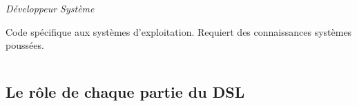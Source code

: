 \documentclass[]{beamer}
\begin{document}
\begin{frame}
\begin{columns}[c]
    \begin{column}[r,T]{115pt}
         {
            \begin{center} \large{\itshape{Développeur Système}} \end{center}
            \scriptsize{
                Code spécifique aux systèmes d'exploitation. Requiert des
                connaissances systèmes poussées.
            }
        }
    \end{column}

\end{columns}
\end{frame}

\subsection{Le rôle de chaque partie du DSL}
\end{document}
